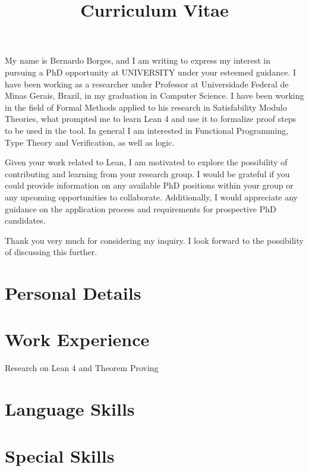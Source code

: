 \documentclass[a4paper]{moderncv}
\title{Curriculum Vitae}
\begin{document}
\makelettertitle
My name is Bernardo Borges, and I am writing to express my interest in pursuing a PhD opportunity at
UNIVERSITY under your esteemed guidance.
I have been working as a researcher under Professor 
at Universidade Federal de Minas Gerais, Brazil, in my graduation in Computer Science.
I have been working in the field of Formal Methods applied to his research in Satisfability Modulo
Theories, what prompted me to learn Lean 4 and use it to formalize proof steps to be used in the
 tool.
In general I am interested in Functional Programming, Type Theory and Verification, as well as logic.

Given your work related to Lean, I am motivated to explore the possibility of contributing and learning
from your research group. I would be grateful if you could provide information on any available PhD
positions within your group or any upcoming opportunities to collaborate.
Additionally, I would appreciate any guidance on the application process and requirements for
prospective PhD candidates.

Thank you very much for considering my inquiry. I look forward to the possibility of discussing
this further.

\makeletterclosing

\newpage

\maketitle
\section{Personal Details}

\section{Work Experience}
{Research on Lean 4 and Theorem Proving}

\section{Language Skills}

\section{Special Skills}
\end{document}
